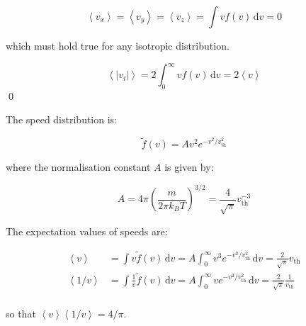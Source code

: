 \documentclass[12pt]{article}
\begin{document}

\begin{equation}
    \left\langle v_{x} \right\rangle = \left\langle v_{y} \right\rangle = \left\langle v_{z} \right\rangle = \int v f(v) \, \mathrm{d}v = 0
\end{equation}

which must hold true for any isotropic distribution.


\begin{equation}
    \left\langle \left\lvert v_{i} \right\rvert \right\rangle = 2 \int_{0}^{\infty} v f(v) \, \mathrm{d}v = 2 \left\langle v \right\rangle
\end{equation}
\qed



The speed distribution is:

\begin{equation}
    \tilde{f}(v) = A v^{2} e^{-v^{2}/v_{\text{th}}^{2}}
\end{equation}

where the normalisation constant $A$ is given by:

\begin{equation}
    A = 4\pi \left( \frac{m}{2\pi k_{B}T} \right)^{3/2} = \frac{4}{\sqrt{\pi}} v_{\text{th}}^{-3}
\end{equation}

The expectation values of speeds are:

\begin{equation}
\begin{split}
    \left\langle v \right\rangle &= \int v \tilde{f}(v) \, \mathrm{d}v = A \int_{0}^{\infty} v^{3} e^{-v^{2}/v_{\text{th}}^{2}} \, \mathrm{d}v = \frac{2}{\sqrt{\pi}} v_{\text{th}} \\
    \left\langle 1/v \right\rangle &= \int \frac{1}{v} \tilde{f}(v) \, \mathrm{d}v = A \int_{0}^{\infty} v e^{-v^{2}/v_{\text{th}}^{2}} \, \mathrm{d}v = \frac{2}{\sqrt{\pi}} \frac{1}{v_{\text{th}}} \\
\end{split}
\end{equation}

so that $\left\langle v \right\rangle \left\langle 1/v \right\rangle = 4/\pi$.

\end{document}
